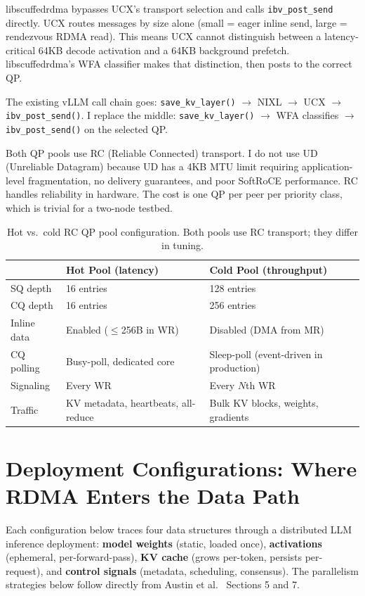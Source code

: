 \documentclass[11pt]{article}
\begin{document}
libscuffedrdma bypasses UCX's transport selection and calls \texttt{ibv\_post\_send} directly. UCX routes messages by size alone (small = eager inline send, large = rendezvous RDMA read). This means UCX cannot distinguish between a latency-critical 64KB decode activation and a 64KB background prefetch. libscuffedrdma's WFA classifier makes that distinction, then posts to the correct QP.

The existing vLLM call chain goes: \texttt{save\_kv\_layer()} $\to$ NIXL $\to$ UCX $\to$ \texttt{ibv\_post\_send()}. I replace the middle: \texttt{save\_kv\_layer()} $\to$ WFA classifies $\to$ \texttt{ibv\_post\_send()} on the selected QP.

Both QP pools use RC (Reliable Connected) transport. I do not use UD (Unreliable Datagram) because UD has a 4KB MTU limit requiring application-level fragmentation, no delivery guarantees, and poor SoftRoCE performance. RC handles reliability in hardware. The cost is one QP per peer per priority class, which is trivial for a two-node testbed.

\begin{table}[ht]
\centering\small
\begin{tabular}{lll}
\toprule
& \textbf{Hot Pool (latency)} & \textbf{Cold Pool (throughput)} \\
\midrule
SQ depth & 16 entries & 128 entries \\
CQ depth & 16 entries & 256 entries \\
Inline data & Enabled ($\leq$256B in WR) & Disabled (DMA from MR) \\
CQ polling & Busy-poll, dedicated core & Sleep-poll (event-driven in production) \\
Signaling & Every WR & Every $N$th WR \\
Traffic & KV metadata, heartbeats, all-reduce & Bulk KV blocks, weights, gradients \\
\bottomrule
\end{tabular}
\caption{Hot vs.\ cold RC QP pool configuration. Both pools use RC transport; they differ in tuning.}
\end{table}

\section{Deployment Configurations: Where RDMA Enters the Data Path}

Each configuration below traces four data structures through a distributed LLM inference deployment: \textbf{model weights} (static, loaded once), \textbf{activations} (ephemeral, per-forward-pass), \textbf{KV cache} (grows per-token, persists per-request), and \textbf{control signals} (metadata, scheduling, consensus). The parallelism strategies below follow directly from Austin et al.~\cite{scaling_book} Sections 5 and 7.
\end{document}
